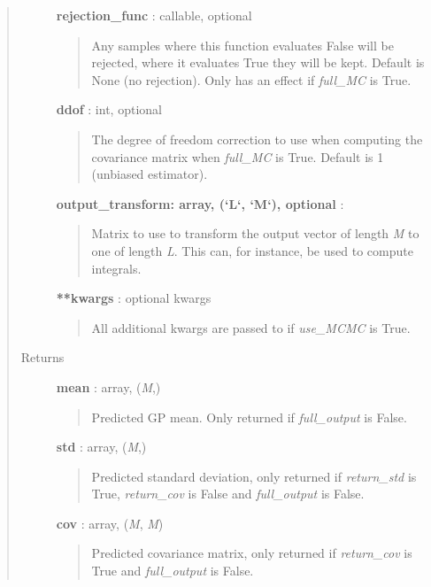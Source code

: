 \documentclass[letterpaper,10pt,english]{sphinxmanual}
\begin{document}
\begin{fulllineitems}
\begin{fulllineitems}
\begin{quote}
\begin{description}
\textbf{rejection\_func} : callable, optional
\begin{quote}

Any samples where this function evaluates False will be rejected,
where it evaluates True they will be kept. Default is None (no
rejection). Only has an effect if \emph{full\_MC} is True.
\end{quote}

\textbf{ddof} : int, optional
\begin{quote}

The degree of freedom correction to use when computing the covariance
matrix when \emph{full\_MC} is True. Default is 1 (unbiased estimator).
\end{quote}

\textbf{output\_transform: array, ({}`L{}`, {}`M{}`), optional} :
\begin{quote}

Matrix to use to transform the output vector of length \emph{M} to one of
length \emph{L}. This can, for instance, be used to compute integrals.
\end{quote}

\textbf{**kwargs} : optional kwargs
\begin{quote}

All additional kwargs are passed to {\hyperref[gptools:gptools.gaussian_process.GaussianProcess.predict_MCMC]{}} if
\emph{use\_MCMC} is True.
\end{quote}

\item[{Returns}] \leavevmode
\textbf{mean} : array, (\emph{M},)
\begin{quote}

Predicted GP mean. Only returned if \emph{full\_output} is False.
\end{quote}

\textbf{std} : array, (\emph{M},)
\begin{quote}

Predicted standard deviation, only returned if \emph{return\_std} is True, \emph{return\_cov} is False and \emph{full\_output} is False.
\end{quote}

\textbf{cov} : array, (\emph{M}, \emph{M})
\begin{quote}

Predicted covariance matrix, only returned if \emph{return\_cov} is True and \emph{full\_output} is False.
\end{quote}


\end{description}
\end{quote}
\end{fulllineitems}
\end{fulllineitems}
\end{document}
